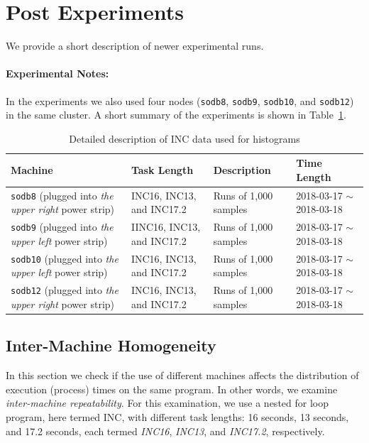 
\clearpage
\newpage

\section{Post Experiments}

We provide a short description of newer experimental runs. 

\paragraph{Experimental Notes:} In the experiments 
we also used four nodes ({\tt sodb8}, {\tt sodb9}, {\tt sodb10}, and {\tt sodb12}) in the same cluster. 
A short summary of the experiments is shown in Table~\ref{tab:exp_notes2}.

\begin{table}[h]
\begin{center}
\begin{tabular}{|p{4cm}|p{3cm}|p{4cm}|p{4cm}|} \hline
Machine & Task Length & Description & Time Length\\ \hline
{\tt sodb8} (plugged into {\em the upper right} power strip) &  INC16, INC13, and INC17.2 & Runs of 1,000 samples & 2018-03-17 $\sim$2018-03-18\\ \hline
{\tt sodb9}  (plugged into {\em the upper left} power strip) &  IINC16, INC13, and INC17.2 & Runs of 1,000 samples & 2018-03-17 $\sim$2018-03-18\\ \hline
{\tt sodb10} (plugged into {\em the upper left} power strip)  & INC16, INC13, and INC17.2 & Runs of 1,000 samples & 2018-03-17 $\sim$2018-03-18\\ \hline
{\tt sodb12} (plugged into {\em the upper right} power strip) & INC16, INC13, and INC17.2 & Runs of 1,000 samples & 2018-03-17 $\sim$2018-03-18\\ \hline
\end{tabular}
\end{center}
\vspace{-.2in}
\caption{Detailed description of INC data used for histograms\label{tab:exp_notes2}}
\end{table}

\subsection{Inter-Machine Homogeneity~\label{sec:diff_machine}} 

In this section we check if the use of different machines affects the distribution of execution (process) times on the same program. 
In other words, we examine {\em inter-machine repeatability}. For this examination, we use a nested for loop program, here termed INC, 
with different task lengths: 16 seconds, 13 seconds, and 17.2 seconds, each termed {\em INC16}, {\em INC13}, and {\em INC17.2}, respectively. 


